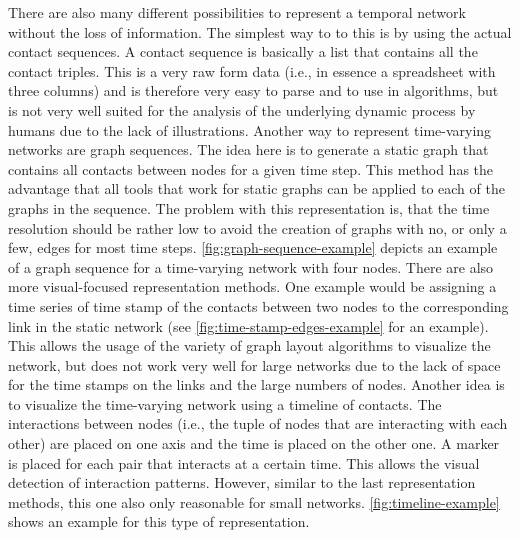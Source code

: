 There are also many different possibilities to represent a temporal network without the loss of information.
The simplest way to to this is by using the actual contact sequences.
A contact sequence is basically a list that contains all the contact triples.
This is a very raw form data (i.e., in essence a spreadsheet with three columns) and is therefore very easy to parse and to use in algorithms, but is not very well suited for the analysis of the underlying dynamic process by humans due to the lack of illustrations.
Another way to represent time-varying networks are graph sequences.
The idea here is to generate a static graph that contains all contacts between nodes for a given time step.
This method has the advantage that all tools that work for static graphs can be applied to each of the graphs in the sequence.
The problem with this representation is, that the time resolution should be rather low to avoid the creation of graphs with no, or only a few, edges for most time steps.
\autoref{fig:graph-sequence-example} depicts an example of a graph sequence for a time-varying network with four nodes.
There are also more visual-focused representation methods.
One example would be assigning a time series of time stamp of the contacts between two nodes to the corresponding link in the static network (see \autoref{fig:time-stamp-edges-example} for an example).
This allows the usage of the variety of graph layout algorithms to visualize the network, but does not work very well for large networks due to the lack of space for the time stamps on the links and the large numbers of nodes.
Another idea is to visualize the time-varying network using a timeline of contacts.
The interactions between nodes (i.e., the tuple of nodes that are interacting with each other) are placed on one axis and the time is placed on the other one.
A marker is placed for each pair that interacts at a certain time.
This allows the visual detection of interaction patterns.
However, similar to the last representation methods, this one also only reasonable for small networks.
\autoref{fig:timeline-example} shows an example for this type of representation.

